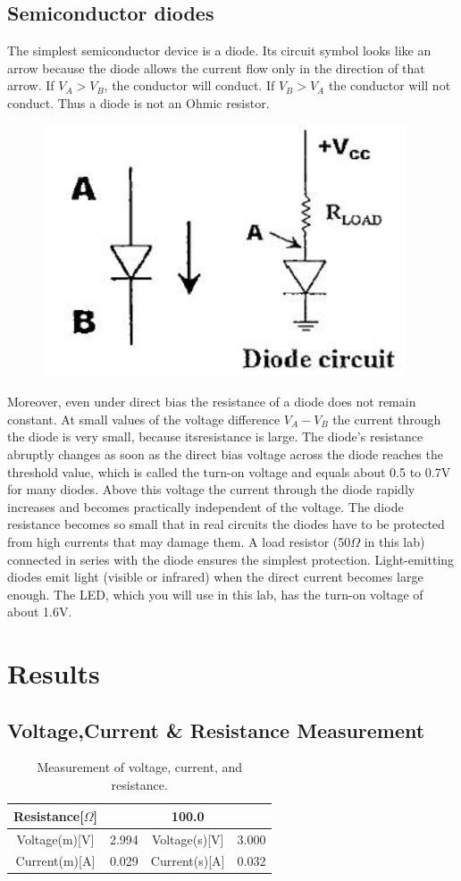 \documentclass[12pt]{article}
\begin{document}
\subsection{Semiconductor diodes}
The simplest semiconductor device is a diode. Its circuit symbol looks like an arrow because the diode allows the current flow only in the direction of that arrow. If $V_A>V_B$, the conductor will conduct. If $V_B>V_A$ the conductor will not conduct. Thus a diode is not an Ohmic resistor.
\begin{figure}[H]
\centering
\includegraphics[scale=0.5]{P5.jpg}
\end{figure}
\par Moreover, even under direct bias the resistance of a diode does not remain constant. At small values of the voltage difference $V_A-V_B$ the current through the diode is very small, because itsresistance is large. The diode’s resistance abruptly changes as soon as the direct bias voltage across the diode reaches the threshold value, which is called the turn-on voltage and equals about
0.5 to 0.7V for many diodes. Above this voltage the current through the diode rapidly increases and becomes practically independent of the voltage. The diode resistance becomes so small that in real circuits the diodes have to be protected from high currents that may damage them. A load resistor (50$\Omega$ in this lab) connected in series with the diode ensures the simplest protection.
Light-emitting diodes emit light (visible or infrared) when the direct current becomes large enough. The LED, which you will use in this lab, has the turn-on voltage of about 1.6V.
\section{Results}
\subsection{Voltage,Current \& Resistance Measurement}
\begin{table}[H]
\centering
\begin{tabular}{|c|c|c|c|}
\hline
Resistance{[}$\Omega${]}  & \multicolumn{3}{c|}{100.0}        \\ \hline
Voltage(m){[}V{]} & 2.994 & Voltage(s){[}V{]} & 3.000 \\ \hline
Current(m){[}A{]} & 0.029 & Current(s){[}A{]} & 0.032 \\ \hline
\end{tabular}
\caption{Measurement of voltage, current, and resistance.}
\end{table}
\end{document}
